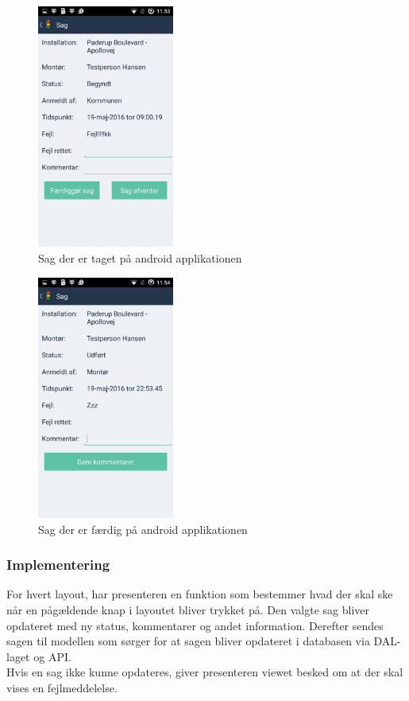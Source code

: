 	\newpage
	
	\begin{figure} [!ht]
		\begin{center}
			\includegraphics[height=8cm]{Android/Billeder/AndroidSagGul}
		\end{center}
		\caption{Sag der er taget på android applikationen}
		\label{fig:Sag der er taget på android applikationen}
	\end{figure}
	
	\begin{figure} [!ht]
		\begin{center}
			\includegraphics[height=8cm]{Android/Billeder/AndroidSagGron}
		\end{center}
		\caption{Sag der er færdig på android applikationen}
		\label{fig:Sag der er faerdig på android applikationen}
	\end{figure}
	
	\subsubsection{Implementering}
	For hvert layout, har presenteren en funktion som bestemmer hvad der skal ske når en pågældende knap i layoutet bliver trykket på. Den valgte sag bliver opdateret med ny status, kommentarer og andet information. Derefter sendes sagen til modellen som sørger for at sagen bliver opdateret i databasen via DAL-laget og API.
	\\Hvis en sag ikke kunne opdateres, giver presenteren viewet besked om at der skal vises en fejlmeddelelse. 
			
